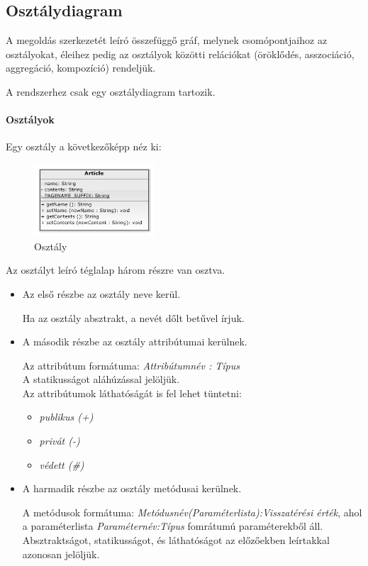 \documentclass[12pt,margin=0px]{article}
\begin{document}
	\subsection*{Osztálydiagram}

    A megoldás szerkezetét leíró összefüggő gráf, melynek csomópontjaihoz az osztályokat, éleihez pedig az osztályok közötti relációkat (öröklődés, asszociáció, aggregáció, kompozíció) rendeljük.
			
	\noindent A rendszerhez csak egy osztálydiagram tartozik.
			
		\paragraph*{Osztályok\\}
				
		  Egy osztály a következőképp néz ki:
		  \begin{figure}[H]
				\centering
				\includegraphics[width=0.4\textwidth]{img/osztaly.png}
				\caption{Osztály}
			\end{figure}
				
			Az osztályt leíró téglalap három részre van osztva.
			\begin{itemize}
				\item Az első részbe az osztály neve kerül.
						
					Ha az osztály absztrakt, a nevét dőlt betűvel írjuk.
						
				\item A második részbe az osztály attribútumai kerülnek.
						
					Az attribútum formátuma: \textit{Attribútumnév : Típus}\\
					A statikusságot aláhúzással jelöljük.\\
					Az attribútumok láthatóságát is fel lehet tüntetni:
                    \begin{itemize}
                        \item \textit{publikus (+)}
                        \item \textit{privát (-)}
                        \item \textit{védett (\#)}
                    \end{itemize}
						
				\item A harmadik részbe az osztály metódusai kerülnek.
						
                    A metódusok formátuma: \textit{Metódusnév(Paraméterlista):Visszatérési érték}, ahol a paraméterlista \textit{Paraméternév:Típus} fomrátumú paraméterekből áll.
					Absztraktságot, statikusságot, és láthatóságot az előzőekben leírtakkal azonosan jelöljük.\\
 			\end{itemize}
\end{document}

